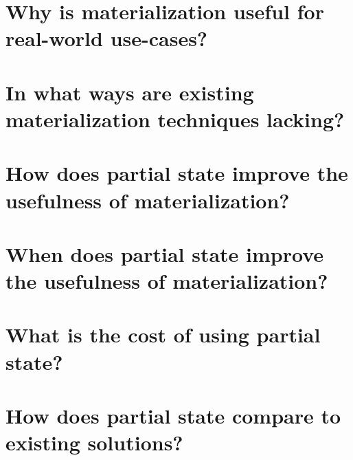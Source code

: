 \section{Why is materialization useful for real-world use-cases?}
\section{In what ways are existing materialization techniques lacking?}
\section{How does partial state improve the usefulness of materialization?}
\section{When does partial state improve the usefulness of materialization?}
\section{What is the cost of using partial state?}
\section{How does partial state compare to existing solutions?}

